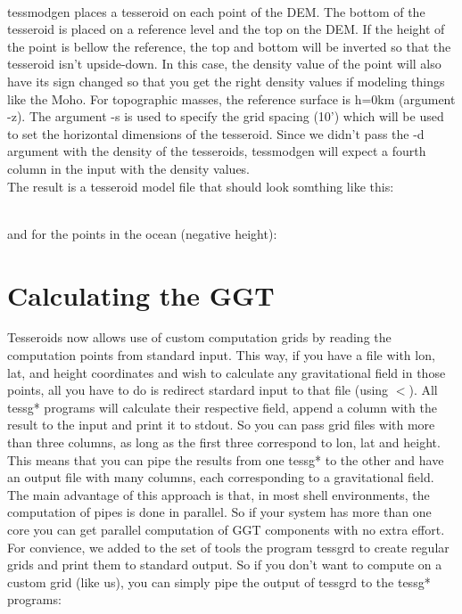 \documentclass[a4paper]{article}
\begin{document}
\hfill\\
\noindent tessmodgen places a tesseroid on each point of the DEM.
The bottom of the tesseroid is placed on a reference level and the top on the DEM.
If the height of the point is bellow the reference, the top and bottom will be inverted
so that the tesseroid isn't upside-down.
In this case, the density value of the point will also have its sign changed so that you get
the right density values if modeling things like the Moho.
For topographic masses, the reference surface is h=0km (argument -z).
The argument -s is used to specify the grid spacing (10') which will be used to
set the horizontal dimensions of the tesseroid.
Since we didn't pass the -d argument with the density of the tesseroids, tessmodgen
will expect a fourth column in the input with the density values.
\\
\indent The result is a tesseroid model file that should look somthing like this:


\hfill\\
\noindent and for the points in the ocean (negative height):



\section{Calculating the GGT}

Tesseroids now allows use of custom computation grids by reading the computation
points from standard input. This way, if you have a file with lon, lat, and height
coordinates and wish to calculate any gravitational field in those points, all you
have to do is redirect stardard input to that file (using $<$).
All tessg* programs will calculate their respective field, append a column with the result
to the input and print it to stdout.
So you can pass grid files with more than three columns, as long as the first three
correspond to lon, lat and height.
This means that you can pipe the results from one tessg* to the other and have an
output file with many columns, each corresponding to a gravitational field.
The main advantage of this approach is that, in most shell environments, the computation
of pipes is done in parallel. So if your system has more than one core you can get
parallel computation of GGT components with no extra effort.
\\
\indent For convience, we added to the set of tools the program tessgrd to create regular
grids and print them to standard output. So if you don't want to compute on a
custom grid (like us), you can simply pipe the output of tessgrd to the tessg* programs:
\end{document}
